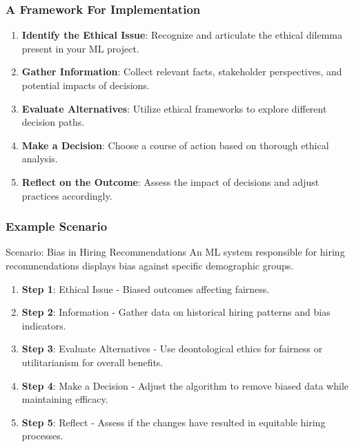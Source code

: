 \documentclass[aspectratio=169]{beamer}
\begin{document}
\begin{frame}[fragile]
    \frametitle{A Framework For Implementation}
    \begin{enumerate}
        \item \textbf{Identify the Ethical Issue}: Recognize and articulate the ethical dilemma present in your ML project.
        \item \textbf{Gather Information}: Collect relevant facts, stakeholder perspectives, and potential impacts of decisions.
        \item \textbf{Evaluate Alternatives}: Utilize ethical frameworks to explore different decision paths.
        \item \textbf{Make a Decision}: Choose a course of action based on thorough ethical analysis.
        \item \textbf{Reflect on the Outcome}: Assess the impact of decisions and adjust practices accordingly.
    \end{enumerate}
\end{frame}

\begin{frame}[fragile]
    \frametitle{Example Scenario}
    \begin{block}{Scenario: Bias in Hiring Recommendations}
        An ML system responsible for hiring recommendations displays bias against specific demographic groups.
    \end{block}
    \begin{enumerate}
        \item \textbf{Step 1}: Ethical Issue - Biased outcomes affecting fairness.
        \item \textbf{Step 2}: Information - Gather data on historical hiring patterns and bias indicators.
        \item \textbf{Step 3}: Evaluate Alternatives - Use deontological ethics for fairness or utilitarianism for overall benefits.
        \item \textbf{Step 4}: Make a Decision - Adjust the algorithm to remove biased data while maintaining efficacy.
        \item \textbf{Step 5}: Reflect - Assess if the changes have resulted in equitable hiring processes.
    \end{enumerate}
\end{frame}
\end{document}
